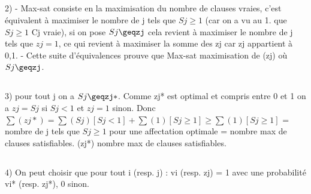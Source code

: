 \documentclass{article}
\begin{document}
\subsection{}
2) - Max-sat consiste en la maximisation du nombre de clauses vraies, c'est équivalent à maximiser le nombre de j tels que $Sj\geq1$ (car on a vu au 1. que $Sj\geq1$ \Leftrightarrow Cj vraie), si on pose $Sj\geqzj$ cela revient à maximiser le nombre de j tels que $zj=1$, ce qui revient à maximiser la somme des zj car zj appartient à {0,1}.
- Cette suite d'équivalences prouve que Max-sat \Leftrightarrow maximisation de \sum(zj) où $Sj\geqzj$.
\subsection{}
3) pour tout j on a $Sj\geqzj*$. Comme zj* est optimal et compris entre 0 et 1 on a $zj=Sj$ si $Sj<1$ et $zj=1$ sinon.
Donc $\sum(zj*)=\sum(Sj)[Sj<1]+\sum(1)[Sj\geq1] \geq \sum(1)[Sj\geq1]$ = nombre de j tels que $Sj\geq1$ pour une affectation optimale = nombre max de clauses satisfiables. \sum(zj*) \geq nombre max de clauses satisfiables.
\subsection{}
4) On peut choisir que pour tout i (resp. j) : vi (resp. zj) = 1 avec une probabilité vi* (resp. zj*), 0 sinon.
\end{document}
